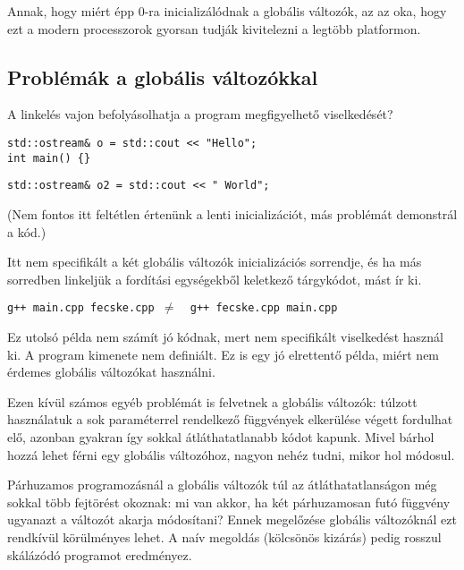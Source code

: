 \documentclass[a4paper,11.5pt,table]{article}
\begin{document}
	Annak, hogy miért épp 0-ra inicializálódnak a globális változók, az az oka, hogy ezt a modern processzorok gyorsan tudják kivitelezni a legtöbb platformon. 
	\subsection{Problémák a globális változókkal}
	
	A linkelés vajon befolyásolhatja a program megfigyelhető viselkedését?
	\bigskip
	
	\begin{lstlisting}
std::ostream& o = std::cout << "Hello";
int main() {}
	\end{lstlisting}
	\bigskip
	
	\begin{lstlisting}
std::ostream& o2 = std::cout << " World";
	\end{lstlisting}
	(Nem fontos itt feltétlen értenünk a lenti inicializációt, más problémát demonstrál a kód.)
	
	Itt nem specifikált a két globális változók inicializációs sorrendje, és ha más sorredben linkeljük a fordítási egységekből keletkező tárgykódot, mást ír ki.
	
	{\centering \texttt{g++ main.cpp fecske.cpp \quad $\not=$\quad\, g++ fecske.cpp main.cpp} \par}
	
	\begin{note}
		Ez utolsó példa nem számít jó kódnak, mert nem specifikált viselkedést használ ki. A program kimenete nem definiált. Ez is egy jó elrettentő példa, miért nem érdemes globális változókat használni.
	\end{note}
	
	Ezen kívül számos egyéb problémát is felvetnek a globális változók: túlzott használatuk a sok paraméterrel rendelkező függvények elkerülése végett fordulhat elő, azonban gyakran így sokkal átláthatatlanabb kódot kapunk. Mivel bárhol hozzá lehet férni egy globális változóhoz, nagyon nehéz tudni, mikor hol módosul.
	\begin{note}
    Párhuzamos programozásnál a globális változók túl az átláthatatlanságon még sokkal több fejtörést okoznak: mi van akkor, ha két párhuzamosan futó függvény ugyanazt a változót akarja módosítani? Ennek megelőzése globális változóknál ezt rendkívül körülményes lehet. A naív megoldás (kölcsönös kizárás) pedig rosszul skálázódó programot eredményez.
	\end{note}
\end{document}
